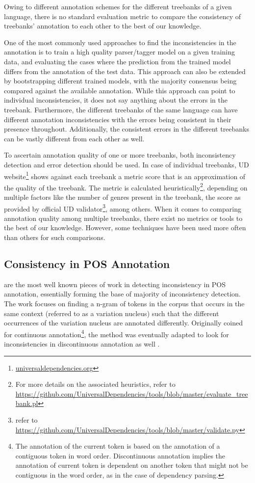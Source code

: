 Owing to different annotation schemes for the different treebanks of a given language, there is no standard evaluation metric to compare the consistency of treebanks' annotation to each other to the best of our knowledge. 

One of the most commonly used approaches to find the inconsistencies in the annotation is to train a high quality parser/tagger model on a given training data, and evaluating the cases where the prediction from the trained model differs from the annotation of the test data. This approach can also be extended by bootstrapping different trained models, with the majority consensus being compared against the available annotation. While this approach can point to individual inconsistencies, it does not say anything about the errors in the treebank. Furthermore, the different treebanks of the same language can have different annotation inconsistencies with the errors being consistent in their presence throughout. Additionally, the consistent errors in the different treebanks can be vastly different from each other as well.

To ascertain annotation quality of one or more treebanks, both inconsistency detection and error detection should be used. In case of individual treebanks, UD website\footnote{\url{universaldependencies.org}} shows against each treebank a metric score that is an approximation of the quality of the treebank. The metric is calculated heuristically\footnote{For more details on the associated heuristics, refer to \url{https://github.com/UniversalDependencies/tools/blob/master/evaluate_treebank.pl}}, depending on multiple factors like the number of genres present in the treebank, the score as provided by official UD validator\footnote{refer to \url{https://github.com/UniversalDependencies/tools/blob/master/validate.py}}, among others. When it comes to comparing annotation quality among multiple treebanks, there exist no metrics or tools to the best of our knowledge. However, some techniques have been used more often than others for such comparisons.

\subsection{Consistency in POS Annotation}
\label{ssec:inconsistency-detection-pos}

\cite{dickinson03a, dickinson03b} are the most well known pieces of work in detecting inconsistency in POS annotation, essentially forming the base of majority of inconsistency detection. The work focuses on finding a n-gram of tokens in the corpus that occurs in the same context (referred to as a variation nucleus) such that the different occurrences of the variation nucleus are annotated differently. Originally coined for continuous annotation\footnote{The annotation of the current token is based on the annotation of a contiguous token in word order. Discontinuous annotation implies the annotation of current token is dependent on another token that might not be contiguous in the word order, as in the case of dependency parsing.}, the method was eventually adapted to look for inconsistencies in discontinuous annotation as well \citep{dickinson05}.

